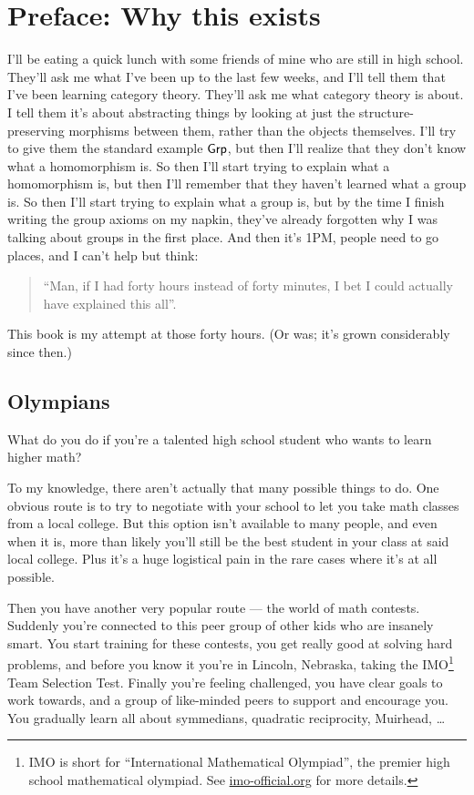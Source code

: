 \chapter*{Preface: Why this exists}
I'll be eating a quick lunch with some friends of mine who are still in high school.
They'll ask me what I've been up to the last few weeks,
and I'll tell them that I've been learning category theory.
They'll ask me what category theory is about.
I tell them it's about abstracting things by looking at just the
structure-preserving morphisms between them, rather than the objects themselves.
I'll try to give them the standard example $\mathsf{Grp}$,
but then I'll realize that they don't know what a homomorphism is.
So then I'll start trying to explain what a homomorphism is,
but then I'll remember that they haven't learned what a group is.
So then I'll start trying to explain what a group is,
but by the time I finish writing the group axioms on my napkin,
they've already forgotten why I was talking about groups in the first place.
And then it's 1PM, people need to go places, and I can't help but think:
\begin{quote}
	``Man, if I had forty hours instead of forty minutes, I bet I could actually have explained this all''.
\end{quote}
This book is my attempt at those forty hours.
(Or was; it's grown considerably since then.)

\section*{Olympians}
What do you do if you're a talented high school student
who wants to learn higher math?

To my knowledge, there aren't actually that many possible things to do.
One obvious route is to try to negotiate with your school to
let you take math classes from a local college.
But this option isn't available to many people,
and even when it is, more than likely you'll still be the
best student in your class at said local college.
Plus it's a huge logistical pain in the rare cases where it's at all possible.

Then you have another very popular route --- the world of math contests.
Suddenly you're connected to this peer group of other kids who are insanely smart.
You start training for these contests,
you get really good at solving hard problems,
and before you know it you're in Lincoln, Nebraska, taking the
IMO\footnote{IMO is short for ``International Mathematical Olympiad'',
	the premier high school mathematical olympiad.
	See \url{imo-official.org} for more details.} Team Selection Test.
Finally you're feeling challenged, you have clear goals to work towards,
and a group of like-minded peers to support and encourage you.
You gradually learn all about symmedians, quadratic reciprocity, Muirhead, \dots

